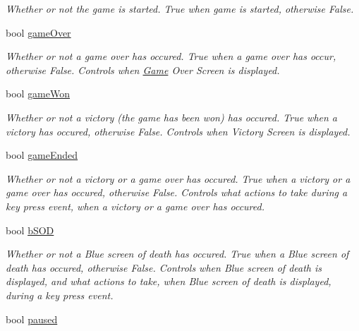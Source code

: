 \begin{DoxyCompactItemize}
\begin{DoxyCompactList}\small\item\em \-Whether or not the game is started. \-True when game is started, otherwise \-False. \end{DoxyCompactList}\item 
\hypertarget{classGame_a21f9857b2d4b38b97ec90b9c2ce3413d}{bool \hyperlink{classGame_a21f9857b2d4b38b97ec90b9c2ce3413d}{game\-Over}}\label{classGame_a21f9857b2d4b38b97ec90b9c2ce3413d}

\begin{DoxyCompactList}\small\item\em \-Whether or not a game over has occured. \-True when a game over has occur, otherwise \-False. \-Controls when \hyperlink{classGame}{\-Game} \-Over \-Screen is displayed. \end{DoxyCompactList}\item 
\hypertarget{classGame_a55d6d8def7c867d94f8ae820884f1aff}{bool \hyperlink{classGame_a55d6d8def7c867d94f8ae820884f1aff}{game\-Won}}\label{classGame_a55d6d8def7c867d94f8ae820884f1aff}

\begin{DoxyCompactList}\small\item\em \-Whether or not a victory (the game has been won) has occured. \-True when a victory has occured, otherwise \-False. \-Controls when \-Victory \-Screen is displayed. \end{DoxyCompactList}\item 
\hypertarget{classGame_a2988aab32f3a086595ba3d1d675d9bee}{bool \hyperlink{classGame_a2988aab32f3a086595ba3d1d675d9bee}{game\-Ended}}\label{classGame_a2988aab32f3a086595ba3d1d675d9bee}

\begin{DoxyCompactList}\small\item\em \-Whether or not a victory or a game over has occured. \-True when a victory or a game over has occured, otherwise \-False. \-Controls what actions to take during a key press event, when a victory or a game over has occured. \end{DoxyCompactList}\item 
\hypertarget{classGame_aea8eb9e9304b43e6ecc2c4a0377d3155}{bool \hyperlink{classGame_aea8eb9e9304b43e6ecc2c4a0377d3155}{b\-S\-O\-D}}\label{classGame_aea8eb9e9304b43e6ecc2c4a0377d3155}

\begin{DoxyCompactList}\small\item\em \-Whether or not a \-Blue screen of death has occured. \-True when a \-Blue screen of death has occured, otherwise \-False. \-Controls when \-Blue screen of death is displayed, and what actions to take, when \-Blue screen of death is displayed, during a key press event. \end{DoxyCompactList}\item 
\hypertarget{classGame_a255049de8fb46a9f00946631e3121c03}{bool \hyperlink{classGame_a255049de8fb46a9f00946631e3121c03}{paused}}\label{classGame_a255049de8fb46a9f00946631e3121c03}


\end{DoxyCompactItemize}

